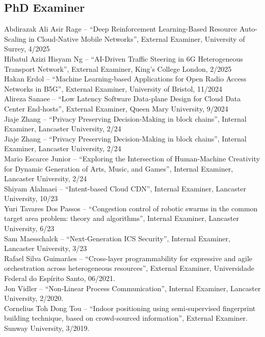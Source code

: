 \documentclass[10pt, a4paper]{article}
\begin{document}

\subsection{PhD Examiner}
\begin{EntriesList}

Abdirazak Ali Asir Rage -- ``Deep Reinforcement Learning-Based Resource
Auto-Scaling in Cloud-Native Mobile Networks'', External Examiner, University of
Surrey, 4/2025\\
Hibatul Azizi Hisyam Ng -- ``AI-Driven Traffic Steering in 6G Heterogeneous Transport Network'', External Examiner, King's College London, 2/2025\\
Hakan Erdol -- ``Machine Learning-based Applications for
Open Radio Access Networks in B5G'', External Examiner, University of Bristol, 11/2024\\
Alireza Sanaee -- ``Low Latency Software Data-plane Design
for Cloud Data Center End-hosts'', External Examiner, Queen Mary University, 9/2024\\
Jiaje Zhang -- ``Privacy Preserving Decision-Making in block chains'', Internal Examiner, Lancaster University, 2/24\\ 
Jiaje Zhang -- ``Privacy Preserving Decision-Making in block chains'', Internal Examiner, Lancaster University, 2/24\\ 
Mario Escarce Junior -- ``Exploring the Intersection of Human-Machine
Creativity for Dynamic Generation of Arts, Music, and Games'', Internal Examiner, Lancaster University, 2/24\\
Shiyam Alalmaei -- ``Intent-based Cloud CDN'', Internal Examiner, Lancaster University, 10/23\\
Yuri Tavares Dos Passos  -- ``Congestion control of robotic swarms in the common target area
problem: theory and algorithms'', Internal Examiner, Lancaster University, 6/23\\
Sam Maesschalck -- ``Next-Generation ICS Security'', Internal Examiner, Lancaster University, 3/23\\
Rafael Silva Guimarães -- ``Cross-layer programmability for expressive and agile
orchestration across heterogeneous resources'', External Examiner, Universidade Federal do Espírito Santo, 06/2021. \\
Jon Vidler -- ``Non-Linear Process Communication'', Internal Examiner, Lancaster
University, 2/2020. \\
Cornelius Toh Dong Tou -- ``Indoor positioning using semi-supervised fingerprint
building technique, based on crowd-sourced information'', External Examiner.
Sunway University, 3/2019.

\end{EntriesList}
\end{document}

